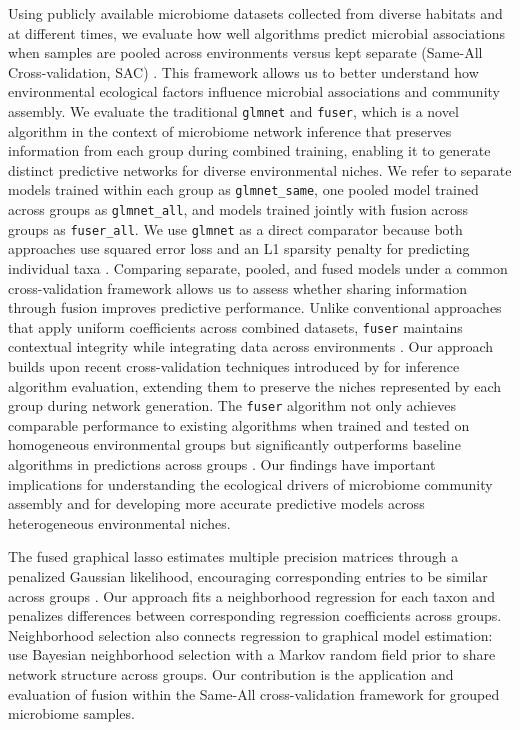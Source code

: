\documentclass[]{Liebert_Author_revised}
\begin{document}
Using publicly available microbiome datasets collected from diverse habitats and at different times, we evaluate how well algorithms predict microbial associations when samples are pooled across environments versus kept separate (Same-All Cross-validation, SAC) \citep{thaiss2016microbiome,thompson2017}.
This framework allows us to better understand how environmental ecological factors influence microbial associations and community assembly.
We evaluate the traditional \texttt{glmnet} and \texttt{fuser}, which is a novel algorithm in the context of microbiome network inference that preserves information from each group during combined training, enabling it to generate distinct predictive networks for diverse environmental niches.
We refer to separate models trained within each group as \texttt{glmnet\_same}, one pooled model trained across groups as \texttt{glmnet\_all}, and models trained jointly with fusion across groups as \texttt{fuser\_all}.
We use \texttt{glmnet} as a direct comparator because both approaches use squared error loss and an L1 sparsity penalty for predicting individual taxa \citep{friedman2010glmnet,dondelinger2016hdlss}.
Comparing separate, pooled, and fused models under a common cross-validation framework allows us to assess whether sharing information through fusion improves predictive performance.
Unlike conventional approaches that apply uniform coefficients across combined datasets, \texttt{fuser} maintains contextual integrity while integrating data across environments \citep{papoutsoglou2023machine}.
Our approach builds upon recent cross-validation techniques introduced by \citet{agyapong2025cross} for inference algorithm evaluation, extending them to preserve the niches represented by each group during network generation.
The \texttt{fuser} algorithm not only achieves comparable performance to existing algorithms when trained and tested on homogeneous environmental groups but significantly outperforms baseline algorithms in predictions across groups \citep{moreno2021statistical}.
Our findings have important implications for understanding the ecological drivers of microbiome community assembly and for developing more accurate predictive models across heterogeneous environmental niches.

The fused graphical lasso estimates multiple precision matrices through a penalized Gaussian likelihood, encouraging corresponding entries to be similar across groups \citep{danaher2014joint}.
Our approach fits a neighborhood regression for each taxon and penalizes differences between corresponding regression coefficients across groups.
Neighborhood selection also connects regression to graphical model estimation: \citet{lin2017joint} use Bayesian neighborhood selection with a Markov random field prior to share network structure across groups.
Our contribution is the application and evaluation of fusion within the Same-All cross-validation framework for grouped microbiome samples.
\end{document}
